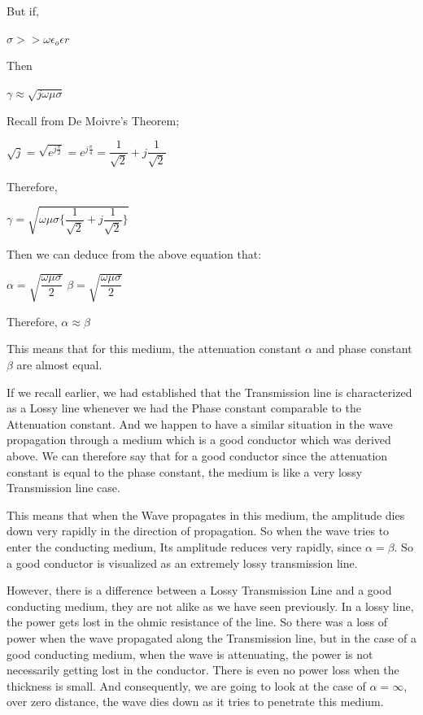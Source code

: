 But if, 
\begin{center}
$\sigma>>\omega\epsilon_{o}\epsilon{r}$
\end{center}

Then

$\gamma\approx\sqrt{j\omega\mu\sigma}$

Recall from De Moivre's Theorem;	

\begin{center}
$\sqrt{j}=\sqrt{e^{j\frac{\pi}{2}}}=e^{j\frac{\pi}{4}}=\dfrac{1}{\sqrt{2}}+j\dfrac{1}{\sqrt{2}}$
\end{center}

Therefore,

\begin{center}		
$\gamma = \sqrt{\omega\mu\sigma\{\dfrac{1}{\sqrt{2}}+j\dfrac{1}{\sqrt{2}}\}}$

\end{center}

Then we can deduce from the above equation that:

\begin{center}

$\alpha=\sqrt{\dfrac{\omega\mu\sigma}{2}}$  $\beta=\sqrt{\dfrac{\omega\mu\sigma}{2}}$

\end{center}

Therefore,
$\alpha\approx\beta$

This means that for this medium, the attenuation constant $\alpha$ and phase constant $\beta$ are almost equal.

If we recall earlier, we had established that the Transmission line is characterized as a Lossy line whenever we had the Phase constant comparable to the Attenuation constant. And we happen to have a similar situation in the wave propagation through a medium which is a good conductor which was derived above. We can therefore say that for a good conductor since the attenuation constant is equal to the phase constant, the medium is like a very lossy Transmission line case.

This means that when the Wave propagates in this medium, the amplitude dies down very rapidly in the direction of propagation. So when the wave tries to enter the conducting medium, Its amplitude reduces very rapidly, since $\alpha=\beta$. So a good conductor is visualized as an extremely lossy transmission line.

However, there is a difference between a Lossy Transmission Line and a good conducting medium, they are not alike as we have seen previously. In a lossy line, the power gets lost in the ohmic resistance of the line. So there was a loss of power when the wave propagated along the Transmission line, but in the case of a good conducting medium, when the wave is attenuating, the power is not necessarily getting lost in the conductor. There is even no power loss when the thickness is small. And consequently, we are going to look at the case of $\alpha=\infty$, over zero distance, the wave dies down as it tries to penetrate this medium.

